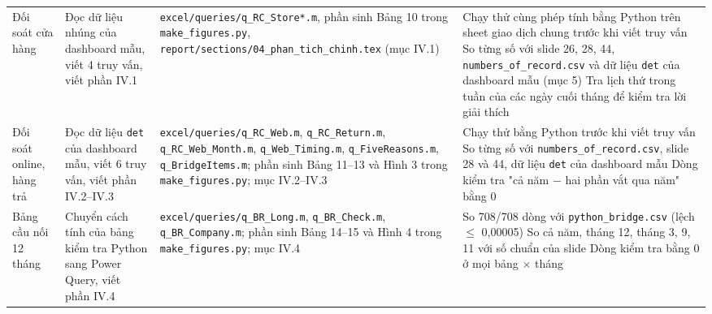 {\begin{longtable}{@{}L{2.1cm} L{3.6cm} L{4.2cm} L{5.2cm}@{}}
Đối soát cửa hàng & Đọc dữ liệu nhúng của dashboard mẫu, viết 4 truy vấn, viết phần IV.1 & \texttt{excel/\allowbreak{}queries/\allowbreak{}q\_\allowbreak{}RC\_\allowbreak{}Store*.\allowbreak{}m}, phần sinh Bảng 10 trong \texttt{make\_\allowbreak{}figures.\allowbreak{}py}, \texttt{report/\allowbreak{}sections/\allowbreak{}04\_\allowbreak{}phan\_\allowbreak{}tich\_\allowbreak{}chinh.\allowbreak{}tex} (mục IV.1) & \textbullet{} Chạy thử cùng phép tính bằng Python trên sheet giao dịch chung trước khi viết truy vấn \newline \textbullet{} So từng số với slide 26, 28, 44, \texttt{numbers\_\allowbreak{}of\_\allowbreak{}record.\allowbreak{}csv} và dữ liệu \texttt{det} của dashboard mẫu (mục 5) \newline \textbullet{} Tra lịch thứ trong tuần của các ngày cuối tháng để kiểm tra lời giải thích \\
Đối soát online, hàng trả & Đọc dữ liệu \texttt{det} của dashboard mẫu, viết 6 truy vấn, viết phần IV.2–IV.3 & \texttt{excel/\allowbreak{}queries/\allowbreak{}q\_\allowbreak{}RC\_\allowbreak{}Web.\allowbreak{}m}, \texttt{q\_\allowbreak{}RC\_\allowbreak{}Return.\allowbreak{}m}, \texttt{q\_\allowbreak{}RC\_\allowbreak{}Web\_\allowbreak{}Month.\allowbreak{}m}, \texttt{q\_\allowbreak{}Web\_\allowbreak{}Timing.\allowbreak{}m}, \texttt{q\_\allowbreak{}FiveReasons.\allowbreak{}m}, \texttt{q\_\allowbreak{}BridgeItems.\allowbreak{}m}; phần sinh Bảng 11–13 và Hình 3 trong \texttt{make\_\allowbreak{}figures.\allowbreak{}py}; mục IV.2–IV.3 & \textbullet{} Chạy thử bằng Python trước khi viết truy vấn \newline \textbullet{} So từng số với \texttt{numbers\_\allowbreak{}of\_\allowbreak{}record.\allowbreak{}csv}, slide 28 và 44, dữ liệu \texttt{det} của dashboard mẫu \newline \textbullet{} Dòng kiểm tra "cả năm $-$ hai phần vắt qua năm" bằng 0 \\
Bảng cầu nối 12 tháng & Chuyển cách tính của bảng kiểm tra Python sang Power Query, viết phần IV.4 & \texttt{excel/\allowbreak{}queries/\allowbreak{}q\_\allowbreak{}BR\_\allowbreak{}Long.\allowbreak{}m}, \texttt{q\_\allowbreak{}BR\_\allowbreak{}Check.\allowbreak{}m}, \texttt{q\_\allowbreak{}BR\_\allowbreak{}Company.\allowbreak{}m}; phần sinh Bảng 14–15 và Hình 4 trong \texttt{make\_\allowbreak{}figures.\allowbreak{}py}; mục IV.4 & \textbullet{} So 708/708 dòng với \texttt{python\_\allowbreak{}bridge.\allowbreak{}csv} (lệch $\le$ 0,00005) \newline \textbullet{} So cả năm, tháng 12, tháng 3, 9, 11 với số chuẩn của slide \newline \textbullet{} Dòng kiểm tra bằng 0 ở mọi bảng $\times$ tháng \\

\end{longtable}}
